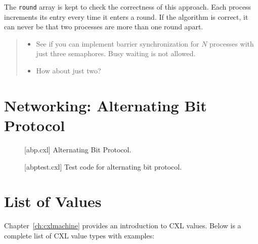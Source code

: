 \documentclass{report}
\newenvironment{code}{
\tcolorbox
}{
\endtcolorbox
}
\begin{document}
The \texttt{round} array is kept to check the correctness of this
approach.  Each process increments its entry every time it enters
a round.  If the algorithm is correct, it can never be that two processes
are more than one round apart.

\begin{quote}
\begin{itemize}
\item See if you can implement barrier synchronization for $N$ processes
with just three semaphores.  Busy waiting is not allowed.
\item How about just two?
\end{itemize}
\end{quote}

\chapter{Networking: Alternating Bit Protocol}
\label{ch:abp}

\begin{figure}
\begin{code}
\end{code}
\caption{[abp.cxl] Alternating Bit Protocol.}
\label{fig:abp}
\end{figure}

\begin{figure}
\begin{code}
\end{code}
\caption{[abptest.cxl] Test code for alternating bit protocol.}
\label{fig:abptest}
\end{figure}




\appendix

\chapter{List of Values}

Chapter~\ref{ch:cxlmachine} provides an introduction to CXL values.
Below is a complete list of CXL value types with examples:
\end{document}
